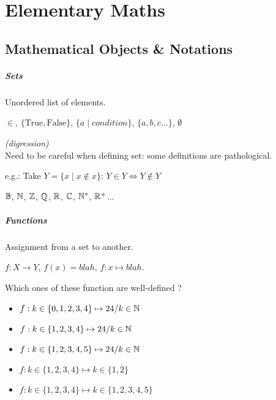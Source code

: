 \section{Elementary Maths}

\subsection{Mathematical Objects \& Notations}
\subparagraph{Sets}
\begin{definition}[Sets]
    Unordered list of elements.
\end{definition}
\begin{notation}[Sets]
    $\in$, $\{ \text{True}, \text{False} \}$, $\{ a \mid condition \}$, $\{ a, b, c \dots \}$, $\emptyset$
\end{notation}

\begin{remark}
    \textit{(digression)}\\
    Need to be careful when defining set: some definitions are pathological.
    
    e.g.: Take $Y = \{x \mid x \not\in x\}$:
    $Y \in Y \iff Y \not\in Y$
\end{remark}
\begin{notation}
    $\mathbb{B}$, $\mathbb{N}$, $\mathbb{Z}$, $\mathbb{Q}$, $\mathbb{R}$, $\mathbb{C}$, $\mathbb{N}^*$, $\mathbb{R}^+$...
\end{notation}

\subparagraph{Functions}
\begin{definition}[Functions]
    Assignment from a set to another.
\end{definition}
\begin{notation}[Function]
    $f: X \to Y$, $f(x)=blah$, $f: x \mapsto blah$.
\end{notation}
\begin{question}
    Which ones of these function are well-defined ?
    \begin{itemize}
        \item $f:k\in\{0,1,2,3,4\}\mapsto 24/k\in \mathbb{N}$
        \item $f:k\in \{1,2,3,4\}\mapsto 24/k\in \mathbb{N}$
        \item $f:k\in \{1,2,3,4,5\}\mapsto 24/k\in \mathbb{N}$
        \item $f:k\in \{1,2,3,4\}\mapsto k\in \{1,2\}$
        \item $f:k\in \{1,2,3,4\}\mapsto k\in \{1,2,3,4,5\}$
    \end{itemize}
\end{question}




